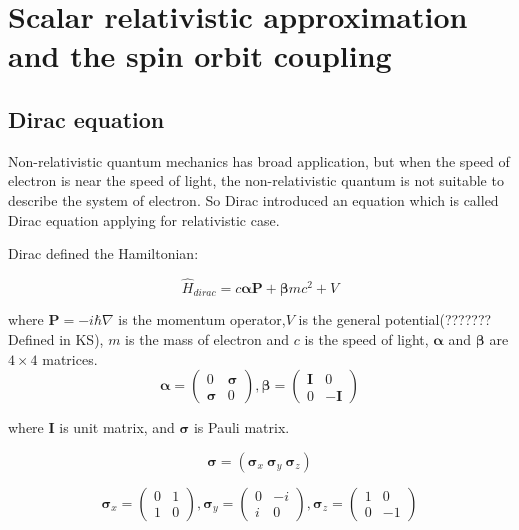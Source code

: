 \documentclass[a4paper]{report}
\begin{document}
\chapter{Scalar relativistic approximation and the spin orbit coupling}
\label{ch:dft}

\section{Dirac equation}


\noindent Non-relativistic quantum mechanics has broad application, but when the speed of electron is near the speed of light, 
the non-relativistic quantum is not suitable to describe the system of electron. So Dirac introduced an equation which is called
Dirac equation applying for relativistic case.

\noindent Dirac defined the Hamiltonian: 


\begin{equation}\label{dirac}
\hat{H}_\textit{dirac} = c \boldsymbol{\alpha} \textbf{P} + \boldsymbol{\beta}mc^{2} + V
\end{equation}

\noindent where $\textbf{P} = -i\hbar \nabla $ is the momentum operator,$V$ is the general potential(??????? Defined in KS), $m$ is the mass of electron 
and $c$ is the speed of light, $\boldsymbol{\alpha}$ and $\boldsymbol{\beta}$ are $4 \times 4$ matrices.
\begin{equation}
 \boldsymbol{\alpha} = \left( \begin{array}{cc}
 0 & \boldsymbol{\sigma}  \\
 \boldsymbol{\sigma} & 0   \end{array} \right),
\boldsymbol{\beta}= \left( \begin{array}{ccc}
\boldsymbol{I} & 0\\
0 & -\boldsymbol{I}\end{array} \right)
\end{equation}

\noindent where $\boldsymbol{I}$ is unit matrix, and $\boldsymbol{\sigma}$ is Pauli matrix.

\begin{equation} 
\boldsymbol{\sigma} = (\boldsymbol{\sigma}_x \  \boldsymbol{\sigma}_y \  \boldsymbol{\sigma}_z )  
\end{equation}

\begin{equation}
\boldsymbol{\sigma}_x= \left( \begin{array}{cc}
0 & 1\\
1 & 0\end{array} \right),
\boldsymbol{\sigma}_y= \left( \begin{array}{ccc}
0 & -i\\
i & 0\end{array} \right),
\boldsymbol{\sigma}_z= \left( \begin{array}{ccc}
1 & 0\\
0 & -1\end{array} \right)
\end{equation}
\end{document}
